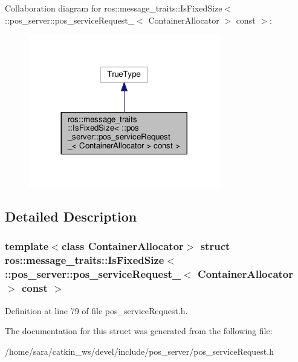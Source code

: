 Collaboration diagram for ros\+:\+:message\+\_\+traits\+:\+:Is\+Fixed\+Size$<$ \+:\+:pos\+\_\+server\+:\+:pos\+\_\+service\+Request\+\_\+$<$ Container\+Allocator $>$ const $>$\+:
\nopagebreak
\begin{figure}[H]
\begin{center}
\leavevmode
\includegraphics[width=236pt]{structros_1_1message__traits_1_1IsFixedSize_3_01_1_1pos__server_1_1pos__serviceRequest___3_01Conce3ed46c58c0949e5edbc42ed5d095cf}
\end{center}
\end{figure}


\subsection{Detailed Description}
\subsubsection*{template$<$class Container\+Allocator$>$\newline
struct ros\+::message\+\_\+traits\+::\+Is\+Fixed\+Size$<$ \+::pos\+\_\+server\+::pos\+\_\+service\+Request\+\_\+$<$ Container\+Allocator $>$ const $>$}



Definition at line 79 of file pos\+\_\+service\+Request.\+h.



The documentation for this struct was generated from the following file\+:\begin{DoxyCompactItemize}
\item 
/home/sara/catkin\+\_\+ws/devel/include/pos\+\_\+server/pos\+\_\+service\+Request.\+h\end{DoxyCompactItemize}
